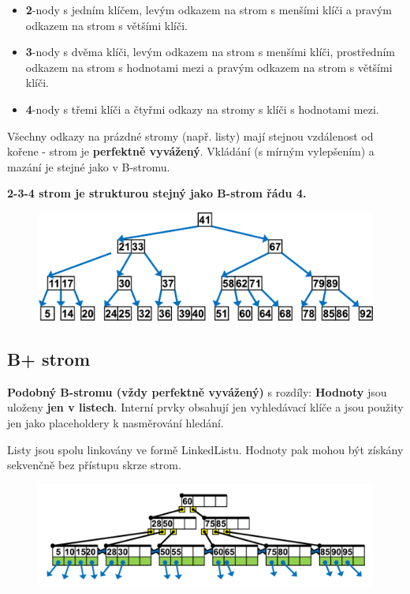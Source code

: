 \begin{itemize}
\item \textbf{2}-nody s jedním klíčem, levým odkazem na strom s menšími klíči a pravým odkazem na strom s většími klíči.
\item \textbf{3}-nody s dvěma klíči, levým odkazem na strom s menšími klíči, prostředním odkazem na strom s hodnotami mezi a pravým odkazem na strom s většími klíči.
\item \textbf{4}-nody s třemi klíči a čtyřmi odkazy na stromy s klíči s hodnotami mezi.
\end{itemize}

Všechny odkazy na prázdné stromy (např. listy) mají stejnou vzdálenost od kořene - strom je \textbf{perfektně vyvážený}. Vkládání (s mírným vylepšením) a mazání je stejné jako v B-stromu.

\textbf{2-3-4 strom je strukturou stejný jako B-strom řádu 4.}

\begin{figure}[h]
    \begin{center}
        \includegraphics[width=130mm]{03/images/234tree}
    \end{center}
\end{figure}

\subsection{B+ strom}
\textbf{Podobný B-stromu (vždy perfektně vyvážený)} s rozdíly: \textbf{Hodnoty} jsou uloženy \textbf{jen v listech}. Interní prvky obsahují jen vyhledávací klíče a jsou použity jen jako placeholdery k nasměrování hledání.

Listy jsou spolu linkovány ve formě LinkedListu. Hodnoty pak mohou být získány sekvenčně bez přístupu skrze strom.

\begin{figure}[h]
    \begin{center}
        \includegraphics[width=130mm]{03/images/bplustree}
    \end{center}
\end{figure}

